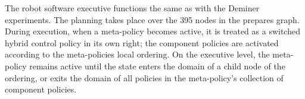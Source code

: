 The robot software executive functions the same as with the Deminer
experiments.  The planning takes place over the 395 nodes in the
prepares graph.  During execution, when a meta-policy becomes active,
it is treated as a switched hybrid control policy in its own right;
the component policies are activated according to the meta-policies
local ordering.  On the executive level, the meta-policy remains
active until the state enters the domain of a child node of the
ordering, or exits the domain of all policies in the meta-policy's
collection of component policies.







